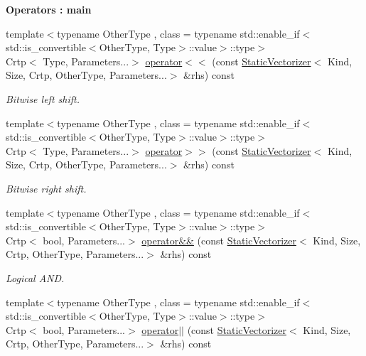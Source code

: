 \begin{Indent}{\bf Operators \-: main}
\begin{DoxyCompactItemize}
{\footnotesize template$<$typename Other\-Type , class  = typename std\-::enable\-\_\-if$<$std\-::is\-\_\-convertible$<$\-Other\-Type, Type$>$\-::value$>$\-::type$>$ }\\Crtp$<$ Type, Parameters...$>$ \hyperlink{classmagrathea_1_1StaticVectorizer_a1ca67dc868dd70423e659b77209e07d9}{operator$<$$<$} (const \hyperlink{classmagrathea_1_1StaticVectorizer}{Static\-Vectorizer}$<$ Kind, Size, Crtp, Other\-Type, Parameters...$>$ \&rhs) const 
\begin{DoxyCompactList}\small\item\em Bitwise left shift. \end{DoxyCompactList}\item 
{\footnotesize template$<$typename Other\-Type , class  = typename std\-::enable\-\_\-if$<$std\-::is\-\_\-convertible$<$\-Other\-Type, Type$>$\-::value$>$\-::type$>$ }\\Crtp$<$ Type, Parameters...$>$ \hyperlink{classmagrathea_1_1StaticVectorizer_a6893af67ac504eeb471690a5114a1365}{operator$>$$>$} (const \hyperlink{classmagrathea_1_1StaticVectorizer}{Static\-Vectorizer}$<$ Kind, Size, Crtp, Other\-Type, Parameters...$>$ \&rhs) const 
\begin{DoxyCompactList}\small\item\em Bitwise right shift. \end{DoxyCompactList}\item 
{\footnotesize template$<$typename Other\-Type , class  = typename std\-::enable\-\_\-if$<$std\-::is\-\_\-convertible$<$\-Other\-Type, Type$>$\-::value$>$\-::type$>$ }\\Crtp$<$ bool, Parameters...$>$ \hyperlink{classmagrathea_1_1StaticVectorizer_aa0b7dd33a216a87e2d8cad3bd06aff45}{operator\&\&} (const \hyperlink{classmagrathea_1_1StaticVectorizer}{Static\-Vectorizer}$<$ Kind, Size, Crtp, Other\-Type, Parameters...$>$ \&rhs) const 
\begin{DoxyCompactList}\small\item\em Logical A\-N\-D. \end{DoxyCompactList}\item 
{\footnotesize template$<$typename Other\-Type , class  = typename std\-::enable\-\_\-if$<$std\-::is\-\_\-convertible$<$\-Other\-Type, Type$>$\-::value$>$\-::type$>$ }\\Crtp$<$ bool, Parameters...$>$ \hyperlink{classmagrathea_1_1StaticVectorizer_a69b7f2ba58c27a4562daa6243d50e67b}{operator$|$$|$} (const \hyperlink{classmagrathea_1_1StaticVectorizer}{Static\-Vectorizer}$<$ Kind, Size, Crtp, Other\-Type, Parameters...$>$ \&rhs) const 

\end{DoxyCompactItemize}
\end{Indent}
